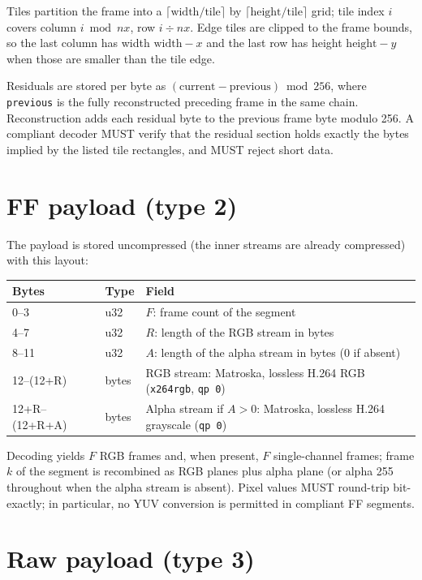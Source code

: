 \documentclass[11pt,a4paper]{article}
\begin{document}
Tiles partition the frame into a $\lceil \text{width}/\text{tile} \rceil$ by
$\lceil \text{height}/\text{tile} \rceil$ grid; tile index $i$ covers column
$i \bmod nx$, row $i \div nx$. Edge tiles are clipped to the frame bounds, so
the last column has width $\text{width}-x$ and the last row has height
$\text{height}-y$ when those are smaller than the tile edge.

Residuals are stored per byte as $(\text{current}-\text{previous}) \bmod 256$,
where \texttt{previous} is the fully reconstructed preceding frame in the same
chain. Reconstruction adds each residual byte to the previous frame byte
modulo 256. A compliant decoder MUST verify that the residual section holds
exactly the bytes implied by the listed tile rectangles, and MUST reject short
data.

\section{FF payload (type 2)}

The payload is stored uncompressed (the inner streams are already compressed)
with this layout:

\begin{center}
\begin{tabular}{@{}lll@{}}
\toprule
Bytes & Type & Field \\
\midrule
0--3 & u32 & $F$: frame count of the segment \\
4--7 & u32 & $R$: length of the RGB stream in bytes \\
8--11 & u32 & $A$: length of the alpha stream in bytes (0 if absent) \\
12--(12+R) & bytes & RGB stream: Matroska, lossless H.264 RGB (\texttt{x264rgb}, \texttt{qp~0}) \\
12+R--(12+R+A) & bytes & Alpha stream if $A > 0$: Matroska, lossless H.264 grayscale (\texttt{qp~0}) \\
\bottomrule
\end{tabular}
\end{center}

Decoding yields $F$ RGB frames and, when present, $F$ single-channel frames;
frame $k$ of the segment is recombined as RGB planes plus alpha plane (or
alpha 255 throughout when the alpha stream is absent). Pixel values MUST
round-trip bit-exactly; in particular, no YUV conversion is permitted in
compliant FF segments.

\section{Raw payload (type 3)}
\end{document}
